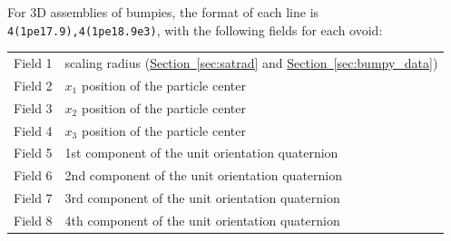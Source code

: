 \documentclass[letterpaper,11pt]{article}
\begin{document}
\par
For 3D assemblies of bumpies,
the format of each line is \texttt{4(1pe17.9),4(1pe18.9e3)}, with
the following fields
for each ovoid:\\
\begin{center}
\begin{tabular}{lp{3.5in}}
Field 1 & scaling radius
         (\hyperref[sec:satrad]{Section~\ref*{sec:satrad}}
         and \hyperref[sec:bumpy_data]{Section~\ref*{sec:bumpy_data}})\\
Field 2 & $x_{1}$ position of the particle center\\
Field 3 & $x_{2}$ position of the particle center\\
Field 4 & $x_{3}$ position of the particle center\\
Field 5 & 1st component of the unit orientation quaternion\\
Field 6 & 2nd component of the unit orientation quaternion\\
Field 7 & 3rd component of the unit orientation quaternion\\
Field 8 & 4th component of the unit orientation quaternion
\end{tabular}
\end{center}
%
\end{document}
